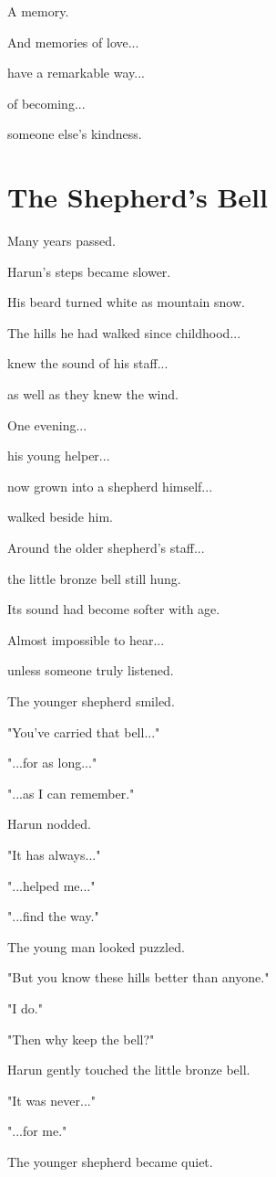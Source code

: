 \documentclass[12pt,openany]{book}
\begin{document}
A memory.

And memories of love...

have a remarkable way...

of becoming...

someone else's kindness.
\section*{The Shepherd's Bell}

Many years passed.

Harun's steps became slower.

His beard turned white as mountain snow.

The hills he had walked since childhood...

knew the sound of his staff...

as well as they knew the wind.

One evening...

his young helper...

now grown into a shepherd himself...

walked beside him.

Around the older shepherd's staff...

the little bronze bell still hung.

Its sound had become softer with age.

Almost impossible to hear...

unless someone truly listened.

The younger shepherd smiled.

"You've carried that bell..."

"...for as long..."

"...as I can remember."

Harun nodded.

"It has always..."

"...helped me..."

"...find the way."

The young man looked puzzled.

"But you know these hills better than anyone."

"I do."

"Then why keep the bell?"

Harun gently touched the little bronze bell.

"It was never..."

"...for me."

The younger shepherd became quiet.
\end{document}
